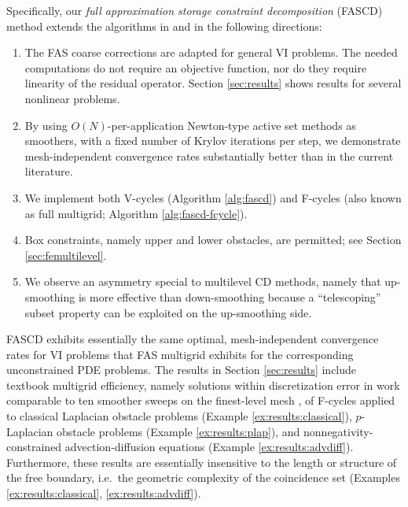 \documentclass[letterpaper,final,12pt,reqno]{amsart}
\theoremstyle{cstyle}
\theoremstyle{cstyle*}
\theoremstyle{dstyle}
\numberwithin{equation}{section}
\numberwithin{figure}{section}
\numberwithin{table}{section}
\numberwithin{theorem}{section}
\begin{document}
Specifically, our \emph{full approximation storage constraint decomposition} (FASCD) method extends the algorithms in \cite{GraeserKornhuber2009} and \cite{Tai2003} in the following directions:
\renewcommand{\labelenumi}{\emph{(\roman{enumi})}}
\begin{enumerate}
\item The FAS coarse corrections are adapted for general VI problems.  The needed computations do not require an objective function, nor do they require linearity of the residual operator.  Section \ref{sec:results} shows results for several nonlinear problems.
\item By using $O(N)$-per-application Newton-type active set methods as smoothers, with a fixed number of Krylov iterations per step, we demonstrate mesh-independent convergence rates substantially better than in the current literature.
\item We implement both V-cycles (Algorithm \ref{alg:fascd}) and F-cycles (also known as full multigrid; Algorithm \ref{alg:fascd-fcycle}).
\item Box constraints, namely upper and lower obstacles, are permitted; see Section \ref{sec:femultilevel}.
\item We observe an asymmetry special to multilevel CD methods, namely that up-smoothing is more effective than down-smoothing because a ``telescoping'' subset property can be exploited on the up-smoothing side.
\end{enumerate}

FASCD exhibits essentially the same optimal, mesh-independent convergence rates for VI problems that FAS multigrid exhibits for the corresponding unconstrained PDE problems.  The results in Section \ref{sec:results} include textbook multigrid efficiency, namely solutions within discretization error in work comparable to ten smoother sweeps on the finest-level mesh \cite{BrandtLivne2011}, of F-cycles applied to classical Laplacian obstacle problems (Example \ref{ex:results:classical}), $p$-Laplacian obstacle problems (Example \ref{ex:results:plap}), and nonnegativity-constrained advection-diffusion equations (Example \ref{ex:results:advdiff}).  Furthermore, these results are essentially insensitive to the length or structure of the free boundary, i.e.~the geometric complexity of the coincidence set (Examples \ref{ex:results:classical}, \ref{ex:results:advdiff}).
\end{document}

